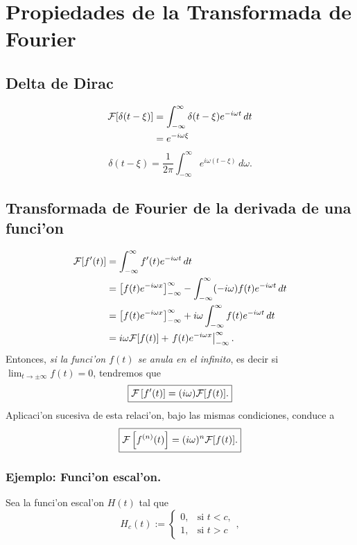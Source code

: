 \section{Propiedades de la Transformada de Fourier} 
\subsection{Delta de Dirac}
\begin{align}
{\cal F}[\delta(t-\xi)] 
 &=\int_{-\infty}^\infty\delta(t-\xi) e^{-i\omega t}\,dt 
\\
 &=e^{-i\omega\xi} \label{Fd}
\end{align}
\begin{equation}
\boxed{ 
\delta(t-\xi) =\frac{1}{2\pi}\int_{-\infty}^\infty e^{i\omega (t-\xi)}\,d\omega. 
 }
\end{equation}
%
\subsection{Transformada de Fourier de la derivada de una funci'on}
\begin{align}
{\cal F}[f'(t)]
 &=\int_{-\infty}^\infty f'(t) e^{-i\omega t}\,dt \\
 &=\left[ f(t) e^{-i\omega x}\right]_{-\infty}^\infty
 -\int_{-\infty}^\infty (-i\omega) f(t) e^{-i\omega t}\,dt \\
 &=\left[ f(t) e^{-i\omega x}\right]_{-\infty}^\infty+ i\omega\int_{-\infty}^\infty f(t) e^{-i\omega t}\,dt \\
 &= i\omega{\cal F}[f(t)]+\left. f(t) e^{-i\omega x}\right|_{-\infty}^\infty.\label{eq:trans-fourier-derivada-gen}
\end{align}
Entonces, \textit{si la funci'on $f(t)$ se anula en el infinito}, es decir si $\lim_{t\to\pm\infty}f(t)=0$, tendremos que
\begin{equation}
\boxed{ 
{\cal F}\left[f'(t)\right] = (i\omega){\cal F}[f(t)]. \label{eq:trans-fourier-derivada-esp}
 } 
\end{equation} 
Aplicaci'on sucesiva de esta relaci'on, bajo las mismas condiciones, conduce a
\begin{equation}
\boxed{ 
{\cal F}\left[f^{(n)}(t)\right] = (i\omega)^n{\cal F}[f(t)]. 
 } 
\end{equation} 



\subsubsection{Ejemplo: Funci'on escal'on.}
Sea la funci'on escal'on $H(t)$ tal que
\begin{equation}
H_c(t) := 
\begin{cases}
0, &\text{si }t < c,\\
1, &\text{si }t > c
\end{cases},
\end{equation}

